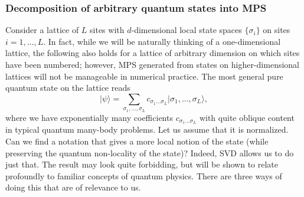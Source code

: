 \documentclass[a4paper,10pt,oneside,onecolumn,1p,times]{elsarticle}
\newcommand{\ket}[1]{\mbox{$| #1  \rangle$}}
\begin{document}
\subsubsection{Decomposition of arbitrary quantum states into MPS}
\label{subsubsec:MPSdecomposition}
Consider a lattice of $L$ sites with $d$-dimensional local state spaces $\{ \sigma_i \}$ on sites $i=1,\ldots,L$. In fact, while we will be naturally thinking of a one-dimensional lattice, the following also holds for a  lattice of arbitrary dimension on which sites have been numbered; however, MPS generated from states on higher-dimensional lattices will not be manageable in numerical practice. The most general pure quantum state on the lattice reads
\begin{equation}
\ket{\psi} = \sum_{\sigma_1,\ldots,\sigma_L} c_{\sigma_1 \ldots \sigma_L} \ket{\sigma_1,\ldots,\sigma_L},
\end{equation}
where we have exponentially many coefficients $c_{\sigma_1 \ldots \sigma_L}$ with quite oblique content in typical quantum many-body problems. Let us assume that it is normalized. Can we find a notation that gives a more local notion of the state (while preserving the quantum non-locality of the state)? Indeed, SVD allows us to do just that. The result may look quite forbidding, but will be shown to relate profoundly to familiar concepts of quantum physics. There are three ways of doing this that are of relevance to us.
\end{document}
